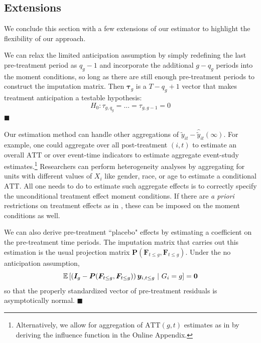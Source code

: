 \documentclass[12pt]{article}
\def\ATT{\text{ATT}}
\begin{document}
\subsection{Extensions}

We conclude this section with a few extensions of our estimator to highlight the flexibility of our approach.

\begin{remark}
We can relax the limited anticipation assumption by simply redefining the last pre-treatment period as $q_g - 1$ and incorporate the additional $g - q_g$ periods into the moment conditions, so long as there are still enough pre-treatment periods to construct the imputation matrix. Then $\bm \tau_g$ is a $T - q_g + 1$ vector that makes treatment anticipation a testable hypothesis:
\begin{equation}
H_0: \tau_{g,q_g} = ... = \tau_{g,g-1} = 0 
\end{equation}
$\blacksquare$
\end{remark} 

\begin{remark}

Our estimation method can handle other aggregations of $\tilde{y}_{it} - \hat{\tilde{y}}_{it}(\infty)$. For example, one could aggregate over all post-treatment $(i,t)$ to estimate an overall $\ATT$ or over event-time indicators to estimate aggregate event-study estimates.\footnote{Alternatively, we allow for aggregation of $\ATT(g,t)$ estimates as in \citet{Callaway_Santanna_2021} by deriving the influence function in the Online Appendix.
} Researchers can perform heterogeneity analyses by aggregating for units with different values of $X_i$ like gender, race, or age to estimate a conditional $\ATT$. All one needs to do to estimate such aggregate effects is to correctly specify the unconditional treatment effect moment conditions. If there are \emph{a priori} restrictions on treatment effects as in \citet{Borusyak_Jaravel_Spiess_2021}, these can be imposed on the moment conditions as well. 

We can also derive pre-treatment ``placebo" effects by estimating a coefficient on the pre-treatment time periods. The imputation matrix that carries out this estimation is the usual projection matrix $\bm P(\bm F_{t \leq g}, \bm F_{t \leq g})$. Under the no anticipation assumption, 
\begin{equation}
  \mathbb{E}\left[ \left( \bm I_{g} - \bm P(\bm F_{t \leq g}, \bm F_{t \leq g}) \right) \bm y_{i, t \leq g} \ \vert \ G_i = g\right] = \bm 0
\end{equation}
so that the properly standardized vector of pre-treatment residuals is asymptotically normal. $\blacksquare$
\end{remark}
\end{document}
